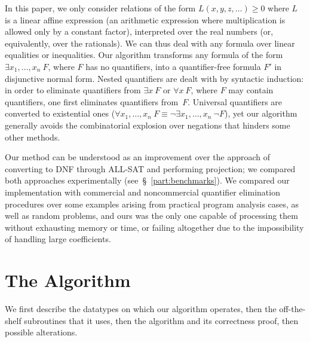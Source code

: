 In this paper, we only consider relations of the form $L(x, y, z, \dots) \geq 0$ where $L$ is a linear affine expression (an arithmetic expression where multiplication is allowed only by a constant factor), interpreted over the real numbers (or, equivalently, over the rationals). We can thus deal with any formula over linear equalities or inequalities. Our algorithm transforms any formula of the form $\exists x_1, \dots, x_n~F$, where $F$ has no quantifiers, into a quantifier-free formula $F'$ in disjunctive normal form. Nested quantifiers are dealt with by syntactic induction: in order to eliminate quantifiers from $\exists x~F$ or $\forall x~F$, where $F$ may contain quantifiers, one first eliminates quantifiers from~$F$. Universal quantifiers are converted to existential ones ($\forall x_1, \dots, x_n~F \equiv \neg \exists x_1, \dots, x_n~\neg F$), yet our algorithm generally avoids the combinatorial explosion over negations that hinders some other methods.

Our method can be understood as an improvement over the approach of converting to DNF through ALL-SAT and performing projection; we compared both approaches experimentally (see~\S~\ref{part:benchmarks}). We compared our implementation with commercial and noncommercial quantifier elimination procedures over some examples arising from practical program analysis cases, as well as random problems, and ours was the only one capable of processing them without exhausting memory or time, or failing altogether due to the impossibility of handling large coefficients.

\section{The Algorithm}
We first describe the datatypes on which our algorithm operates, then the off-the-shelf subroutines that it uses, then the algorithm and its correctness proof, then possible alterations.


